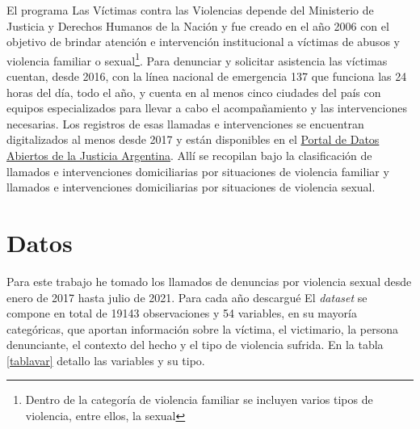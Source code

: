 \documentclass[10 pt]{article}
\begin{document}
El programa Las Víctimas contra las Violencias depende del Ministerio de Justicia y Derechos Humanos de la Nación y fue creado en el año 2006 con el objetivo de brindar atención e intervención institucional a víctimas de abusos y violencia familiar o sexual\footnote{Dentro de la categoría de violencia familiar se incluyen varios tipos de violencia, entre ellos, la sexual}. Para denunciar  y solicitar asistencia las víctimas cuentan, desde 2016, con la línea nacional de emergencia 137 que funciona las 24 horas del día, todo el año, y cuenta en al menos cinco ciudades del país con equipos especializados para llevar a cabo el acompañamiento y las intervenciones necesarias. Los registros de esas llamadas e intervenciones se encuentran digitalizados al menos desde 2017 y están disponibles en el \href{http://datos.jus.gob.ar/}{Portal de Datos Abiertos de la Justicia Argentina}. Allí se recopilan bajo la clasificación de llamados e intervenciones domiciliarias por situaciones de violencia familiar y llamados e intervenciones domiciliarias por situaciones de violencia sexual. 


\section{Datos}\label{dat}

Para este trabajo he tomado los llamados de denuncias por violencia sexual desde enero de 2017 hasta julio de 2021. Para cada año descargué El \textit{dataset} se compone en total de 19143 observaciones y 54 variables, en su mayoría categóricas, que aportan información sobre la víctima, el victimario, la persona denunciante, el contexto del hecho y el tipo de violencia sufrida. En la tabla \ref{tablavar} detallo las variables y su tipo.
\end{document}
